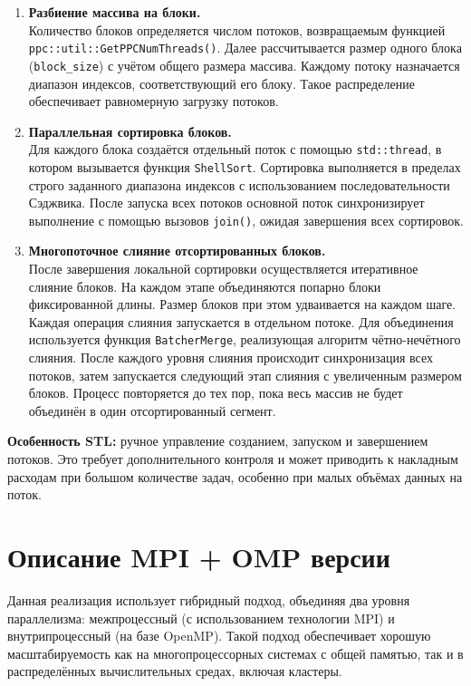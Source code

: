 \documentclass[a4paper,12pt]{article}
\begin{document}
\begin{enumerate}
    \item \textbf{Разбиение массива на блоки.} \\
    Количество блоков определяется числом потоков, возвращаемым функцией \texttt{ppc::util::GetPPCNumThreads()}. Далее рассчитывается размер одного блока (\texttt{block\_size}) с учётом общего размера массива. Каждому потоку назначается диапазон индексов, соответствующий его блоку. Такое распределение обеспечивает равномерную загрузку потоков.

    \item \textbf{Параллельная сортировка блоков.} \\
    Для каждого блока создаётся отдельный поток с помощью \texttt{std::thread}, в котором вызывается функция \texttt{ShellSort}. Сортировка выполняется в пределах строго заданного диапазона индексов с использованием последовательности Сэджвика. После запуска всех потоков основной поток синхронизирует выполнение с помощью вызовов \texttt{join()}, ожидая завершения всех сортировок.

    \item \textbf{Многопоточное слияние отсортированных блоков.} \\
    После завершения локальной сортировки осуществляется итеративное слияние блоков. На каждом этапе объединяются попарно блоки фиксированной длины. Размер блоков при этом удваивается на каждом шаге. Каждая операция слияния запускается в отдельном потоке. Для объединения используется функция \texttt{BatcherMerge}, реализующая алгоритм чётно-нечётного слияния. После каждого уровня слияния происходит синхронизация всех потоков, затем запускается следующий этап слияния с увеличенным размером блоков. Процесс повторяется до тех пор, пока весь массив не будет объединён в один отсортированный сегмент.
\end{enumerate}
\textbf{Особенность STL:} ручное управление созданием, запуском и завершением потоков. Это требует дополнительного контроля и может приводить к накладным расходам при большом количестве задач, особенно при малых объёмах данных на поток.
\newpage

\section{Описание MPI + OMP версии}
Данная реализация использует гибридный подход, объединяя два уровня параллелизма: межпроцессный (с использованием технологии MPI) и внутрипроцессный (на базе OpenMP). Такой подход обеспечивает хорошую масштабируемость как на многопроцессорных системах с общей памятью, так и в распределённых вычислительных средах, включая кластеры.
\end{document}
